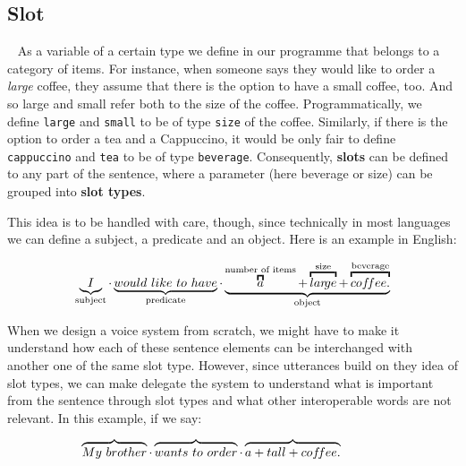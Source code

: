 	\subsection*{Slot}~\label{slots}
	As a variable of a certain type we define in our programme that belongs to a category of items. For instance, when someone says they would like to order a \textit{large} coffee, they assume that there is the option to have a small coffee, too. And so large and small refer both to the size of the coffee. Programmatically, we define \texttt{large} and \texttt{small} to be of type \texttt{size} of the coffee. Similarly, if there is the option to order a tea and a Cappuccino, it would be only fair to define \texttt{cappuccino} and \texttt{tea} to be of type \texttt{beverage}. Consequently, \textbf{slots} can be defined to any part of the sentence, where a parameter (here beverage or size) can be grouped into \textbf{slot types}. 



	This idea is to be handled with care, though, since technically in most languages we can define a subject, a predicate and an object. Here is an example in English:
	
	\[
	\underbrace{I}_\text{subject} \cdot
	\underbrace{would \ like  \ to \ have}_\text{predicate} \cdot
	\underbrace{
		\overbracket{a}^\text{number of items} +		
		\overbracket{lar\!ge}^\text{size} +
		\overbracket{cof \mkern-3mu fee.}^\text{beverage}
	}_\text{object} 
	\]
	
	When we design a voice system from scratch, we might have to make it understand how each of these sentence elements can be interchanged with another one of the same slot type. However, since utterances build on they idea of slot types, we can make delegate the system to understand what is important from the sentence through slot types and what other interoperable words are not relevant. In this example, if we say:
	
	\[
	\overbrace{My \ brother} \cdot
	\overbrace{wants \ to \ order} \cdot
	\overbrace{ a + tall + cof\mkern-3mu fee.}
	\ \ \ \ \ \ \ \ \ \ 
	\]
	
